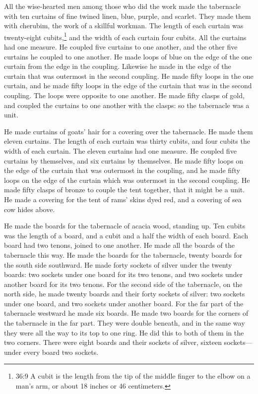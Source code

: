 \myverse{}All the wise-hearted men among those who did the work made the
tabernacle with ten curtains of fine twined linen, blue, purple, and scarlet. They made them with cherubim,
the work of a skillful workman.
\myverse{}The length of each curtain was twenty-eight cubits,\footnote{36:9 A cubit is the length from the tip of the middle finger to the elbow on a man’s arm, or about
	18 inches or 46 centimeters.} and the width of each curtain four cubits. All the curtains had
one measure.
\myverse{}He coupled five curtains to one another, and the other five curtains he coupled
to one another.
\myverse{}He made loops of blue on the edge of the one curtain from the edge in the
coupling. Likewise he made in the edge of the curtain that was outermost in the second coupling.
\myverse{}He made fifty loops in the one curtain, and he made fifty loops in the edge
of the curtain that was in the second coupling. The loops were opposite to one another.
\myverse{}He made fifty clasps of gold, and coupled the curtains to one another with
the clasps: so the tabernacle was a unit.


\myverse{}He made curtains of goats’ hair for a covering over the tabernacle.
He made them eleven curtains.
\myverse{}The length of each curtain was thirty cubits, and four cubits the width of
each curtain. The eleven curtains had one measure.
\myverse{}He coupled five curtains by themselves, and six curtains by themselves.
\myverse{}He made fifty loops on the edge of the curtain that was outermost in the
coupling, and he made fifty loops on the edge of the curtain which was outermost in the second coupling.
\myverse{}He made fifty clasps of bronze to couple the tent together, that it might
be a unit.
\myverse{}He made a covering for the tent of rams’ skins dyed red, and a covering of
sea cow hides above.


\myverse{}He made the boards for the tabernacle of acacia wood, standing
up.
\myverse{}Ten cubits was the length of a board, and a cubit and a half the width of
each board.
\myverse{}Each board had two tenons, joined to one another. He made all the boards
of the tabernacle this way.
\myverse{}He made the boards for the tabernacle, twenty boards for the south side southward.
\myverse{}He made forty sockets of silver under the twenty boards: two sockets under
one board for its two tenons, and two sockets under another board for its two tenons.
\myverse{}For the second side of the tabernacle, on the north side, he made twenty
boards
\myverse{}and their forty sockets of silver: two sockets under one board, and two sockets
under another board.
\myverse{}For the far part of the tabernacle westward he made six boards.
\myverse{}He made two boards for the corners of the tabernacle in the far part.
\myverse{}They were double beneath, and in the same way they were all the way to its
top to one ring. He did this to both of them in the two corners.
\myverse{}There were eight boards and their sockets of silver, sixteen sockets—under
every board two sockets.


